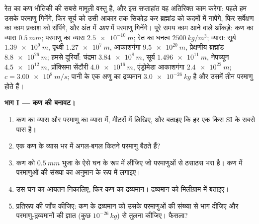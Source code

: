 \begin{problem}
\label{pb:g10:orders-of-magnitude:1}
रेत का कण भौतिकी की सबसे मामूली वस्तु है, और इस सप्ताहांत वह अतिरिक्त
काम करेगा: पहले हम उसके परमाणु गिनेंगे, फिर सूर्य को उसी आकार तक सिकोड़
कर ब्रह्मांड को कदमों में नापेंगे, फिर सर्वेक्षण का काम प्रकाश को
सौंपेंगे, और अंत में \emph{आप} में परमाणु गिनेंगे। पूरे समय काम आने
वाले आँकड़े: कण का व्यास $\qty{0.5}{mm}$; परमाणु का व्यास $\qty{2.5e-10}{m}$; रेत का घनत्व
$\qty{2500}{kg/m^3}$; व्यास: सूर्य $\qty{1.39e9}{m}$, पृथ्वी $\qty{1.27e7}{m}$, आकाशगंगा $\qty{9.5e20}{m}$,
प्रेक्षणीय ब्रह्मांड $\qty{8.8e26}{m}$; हमसे दूरियाँ: चंद्रमा $\qty{3.84e8}{m}$, सूर्य
$\qty{1.496e11}{m}$, नेपच्यून $\qty{4.5e12}{m}$, प्रॉक्सिमा सेंटौरी $\qty{4.0e16}{m}$, एंड्रोमेडा
आकाशगंगा $\qty{2.4e22}{m}$; $c = \qty{3.00e8}{m/s}$; पानी के एक अणु का द्रव्यमान $\qty{3.0e-26}{kg}$ है और
उसमें तीन परमाणु होते हैं।

\medskip
\noindent\textbf{भाग I --- कण की बनावट।}
\begin{enumerate}
  \item कण का व्यास और परमाणु का व्यास  में,
        मीटरों में लिखिए, और बताइए कि हर एक किस SI
         के सबसे पास है।
  \item एक कण के व्यास भर में अगल-बगल कितने परमाणु बैठते हैं?
  \item कण को $\qty{0.5}{mm}$ भुजा के ऐसे घन के रूप में लीजिए जो परमाणुओं से
        ठसाठस भरा है। कण में परमाणुओं की संख्या का अनुमान
         के रूप में लगाइए।
  \item उस घन का आयतन निकालिए, फिर कण का द्रव्यमान। द्रव्यमान को
        मिलीग्राम में बताइए।
  \item प्रतिरूप की जाँच कीजिए: कण के द्रव्यमान को उसके परमाणुओं की
        संख्या से भाग दीजिए और परमाणु-द्रव्यमानों की ज्ञात
         (कुछ $10^{-26}\,\unit{kg}$) से तुलना कीजिए। फैसला?
\end{enumerate}


\end{problem}
